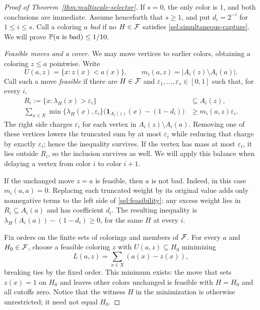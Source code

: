 \begin{proof}[Proof of Theorem~\ref{thm:multiscale-selector}]
If $s=0$, the only color is $1$, and both conclusions are immediate.
Assume henceforth that $s\ge 1$, and put $d_i=2^{-i}$ for
$1\le i\le s$.  Call a coloring $a$ \emph{bad} if no $H\in\F$
satisfies \eqref{sel:simultaneous-capture}.  We will prove
$\P(a\text{ is bad})\le 1/10$.

\medskip
\noindent\textit{Feasible moves and a cover.}
We may move vertices to earlier colors, obtaining a coloring
$z\le a$ pointwise.  Write
\[
  U(a,z)=\{x:z(x)<a(x)\},
  \qquad
  m_i(a,z)=|A_i(z)\setminus A_i(a)|.
\]
Call such a move \emph{feasible} if there are $H\in\F$ and
$\varepsilon_1,\ldots,\varepsilon_s\in[0,1]$ such that, for every $i$,
\begin{equation}
\label{sel:feasibility}
\begin{split}
  R_i:=\{x:\lambda_H(x)>\varepsilon_i\}&\subseteq A_i(z),\\
  \sum_{x\in X}\min\{\lambda_H(x),\varepsilon_i\}
       \bigl(\mathbf 1_{A_i(z)}(x)-(1-d_i)\bigr)
       &\ge m_i(a,z)\varepsilon_i.
\end{split}
\end{equation}
The right side charges $\varepsilon_i$ for each vertex in
$A_i(z)\setminus A_i(a)$. Removing one of these vertices lowers the
truncated sum by at most $\varepsilon_i$ while reducing that charge by exactly $\varepsilon_i$;
hence the inequality survives. If the vertex has mass at most
$\varepsilon_i$, it lies outside $R_i$, so the inclusion survives as
well. We will apply this balance when delaying a vertex from color $i$
to color $i+1$.

If the unchanged move $z=a$ is feasible, then $a$ is not bad.
Indeed, in this case $m_i(a,a)=0$.  Replacing each truncated weight
by its original value adds only nonnegative terms to the left side
of \eqref{sel:feasibility}: any excess weight lies in
$R_i\subseteq A_i(a)$ and has coefficient $d_i$.
The resulting inequality is
$\lambda_H(A_i(a))-(1-d_i)\ge0$, for the same $H$ at every $i$.

Fix orders on the finite sets of colorings and members of $\F$.
For every $a$ and $H_0\in\F$, choose a feasible coloring $z$ with
$U(a,z)\subseteq H_0$ minimizing
\[
  L(a,z)=\sum_{x\in X}(a(x)-z(x)),
\]
breaking ties by the fixed order.  This minimum exists: the move
that sets $z(x)=1$ on $H_0$ and leaves other colors unchanged is
feasible with $H=H_0$ and all cutoffs zero.  Notice that the witness
$H$ in the minimization is otherwise unrestricted; it need not
equal $H_0$.


\end{proof}

